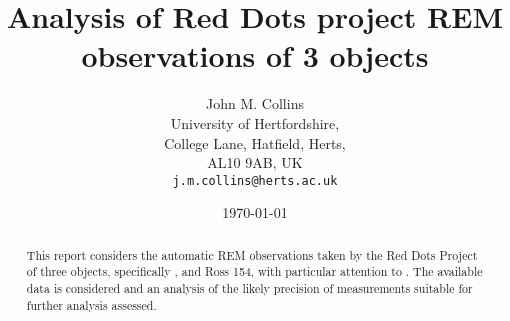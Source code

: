 \title{Analysis of Red Dots project REM observations of 3 {\rdwarf}
objects}

\author{John M. Collins\\
  University of Hertfordshire,\\
  College Lane, Hatfield, Herts, \\
  AL10 9AB, UK\\
  \texttt{j.m.collins@herts.ac.uk}\\
  }
\engwithth
\date{\today}
\maketitle

\protect\label{firstpage}

\begin{abstract}

  This report considers the automatic REM observations taken by the Red Dots
  Project of three {\rdwarf} objects, specifically \prox, {\bstar} and Ross 154,
  with particular attention to \bstar. The available data is considered and an
  analysis of the likely precision of measurements suitable for further analysis
  assessed.
  
\end{abstract}

